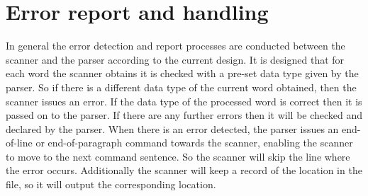 \documentclass[12pt]{article}
\begin{document}
\newpage
\section{Error report and handling}
In general the error detection and report processes are conducted between the scanner and the parser according to the current design. It is designed that for each word the scanner obtains 
it is checked with a pre-set data type given by the parser. So if there is a different data type of the current word obtained, then the scanner issues an error. If the data type of 
the processed word is correct then it is passed on to the parser. If there are any further errors then it will be checked and declared by the parser.
When there is an error detected, the parser issues an end-of-line or end-of-paragraph command towards the scanner, enabling the scanner to move to the next command sentence. So the 
scanner will skip the line where the error occurs. Additionally the scanner will keep a record of the location in the file, so it will output the corresponding location.
\end{document}
